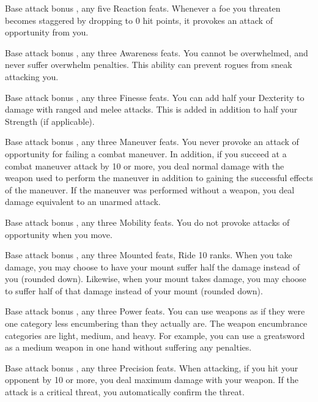  Base attack bonus , any five Reaction feats.
 Whenever a foe you threaten becomes staggered by dropping to 0 hit points, it provokes an attack of opportunity from you.

\featpre Base attack bonus , any three Awareness feats.
\featben You cannot be overwhelmed, and never suffer overwhelm penalties. This ability can prevent rogues from sneak attacking you.

\featpre Base attack bonus , any three Finesse feats.
\featben You can add half your Dexterity to damage with ranged and melee attacks. This is added in addition to half your Strength (if applicable).

\featpre Base attack bonus , any three Maneuver feats.
\featben You never provoke an attack of opportunity for failing a combat maneuver. In addition, if you succeed at a combat maneuver attack by 10 or more, you deal normal damage with the weapon used to perform the maneuver in addition to gaining the successful effects of the maneuver. If the maneuver was performed without a weapon, you deal damage equivalent to an unarmed attack.

\featpre Base attack bonus , any three Mobility feats.
\featben You do not provoke attacks of opportunity when you move.

\featpre Base attack bonus , any three Mounted feats, Ride 10 ranks.
\featben When you take damage, you may choose to have your mount suffer half the damage instead of you (rounded down). Likewise, when your mount takes damage, you may choose to suffer half of that damage instead of your mount (rounded down).

\featpres Base attack bonus , any three Power feats.
\featben You can use weapons as if they were one category less encumbering than they actually are. The weapon encumbrance categories are light, medium, and heavy. For example, you can use a greatsword as a medium weapon in one hand without suffering any penalties.

\featpre Base attack bonus , any three Precision feats.
\featben When attacking, if you hit your opponent by 10 or more, you deal maximum damage with your weapon. If the attack is a critical threat, you automatically confirm the threat.

